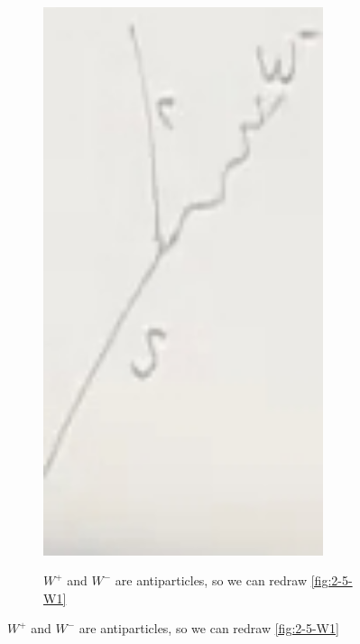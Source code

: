 \documentclass[]{article}
\begin{document}
\begin{figure}[H]
\begin{subfigure}{0.2\textwidth}
		\includegraphics[width=0.9\textwidth]{2-5-W3}
	\end{subfigure}
	\begin{subfigure}{0.2\textwidth}
		\caption{$W^+$ and $W^-$ are antiparticles, so we can redraw \ref{fig:2-5-W1}}

\end{subfigure}
\end{figure}
\end{document}
